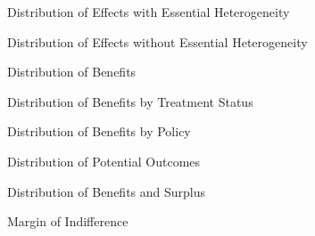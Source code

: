 \begin{frame}
\begin{figure}\caption{Distribution of Effects with Essential Heterogeneity}
\end{figure}
\end{frame}


\begin{frame}
\begin{figure}\caption{Distribution of Effects without Essential Heterogeneity}
\end{figure}
\end{frame}

\begin{frame}
\begin{figure}\caption{Distribution of Benefits}
\end{figure}
\end{frame}

\begin{frame}
\begin{figure}\caption{Distribution of Benefits by Treatment Status}
\end{figure}
\end{frame}

\begin{frame}
\begin{figure}\caption{Distribution of Benefits by Policy}
\end{figure}
\end{frame}

\begin{frame}
\begin{figure}\caption{Distribution of Potential Outcomes}
\end{figure}
\end{frame}

\begin{frame}
\begin{figure}\caption{Distribution of Benefits and Surplus}
\end{figure}
\end{frame}

\begin{frame}
\begin{figure}\caption{Margin of Indifference}
\end{figure}
\end{frame}

